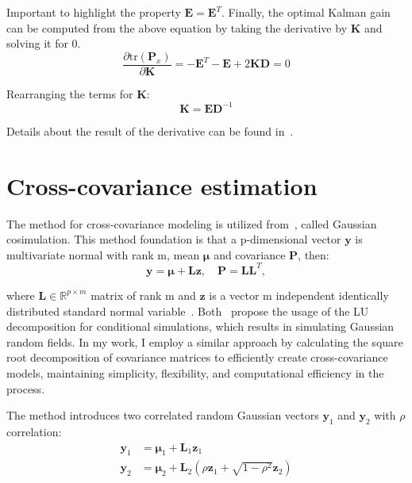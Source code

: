 Important to highlight the property $\mathbf{E}=\mathbf{E}^T$. Finally, the optimal Kalman gain can be computed from the above equation by taking the derivative by $\mathbf{K}$ and solving it for 0.
\begin{equation}
    \frac{\partial \mathrm{tr}(\mathbf{P}_{x})}{\partial\mathbf{K}} = -\mathbf{E}^T-\mathbf{E}+2\mathbf{KD}=0
\end{equation}

Rearranging the terms for $\mathbf{K}$:
\begin{equation}
    \mathbf{K}=\mathbf{E}\mathbf{D}^{-1}
\end{equation}

Details about the result of the derivative can be found in~\cite{discrete_kalman_tutorial}.

\section{Cross-covariance estimation}

The method for cross-covariance modeling is utilized from~\cite{oliver2003gaussian}, called Gaussian cosimulation. This method foundation is that a p-dimensional vector $\mathbf{y}$ is multivariate normal with rank m, mean $\boldsymbol{\mu}$ and covariance $\mathbf{P}$, then:
\begin{equation}
    \mathbf{y}=\boldsymbol{\mu} + \mathbf{L}\mathbf{z}, \quad \mathbf{P}=\mathbf{L}\mathbf{L}^T,
\end{equation}

where $\mathbf{L}\in\mathbb{R}^{p\times m}$ matrix of rank m and $\mathbf{z}$ is a vector m independent identically distributed standard normal variable~\cite{rao}. Both~\cite{Alabert1987, Davis1987} propose the usage of the LU decomposition for conditional simulations, which results in simulating Gaussian random fields. In my work, I employ a similar approach by calculating the square root decomposition of covariance matrices to efficiently create cross-covariance models, maintaining simplicity, flexibility, and computational efficiency in the process.

The method introduces two correlated random Gaussian vectors $\mathbf{y}_1$ and $\mathbf{y}_2$ with $\rho$ correlation:
\begin{equation}
\begin{aligned}
    \mathbf{y}_1 &= \boldsymbol{\mu}_1+\mathbf{L}_1\mathbf{z}_1 \\
    \mathbf{y}_2 &= \boldsymbol{\mu}_2+\mathbf{L}_2\left(\rho\mathbf{z}_1+\sqrt{1-\rho^2}\mathbf{z}_2\right)
\end{aligned}
\end{equation}


